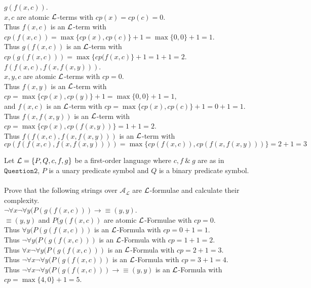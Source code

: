 \documentclass[11pt,a4paper]{article}
\begin{document}
\qpartnb $g(f(x,c))$.\\

\apart
$x,c$ are atomic $\mathcal{L}$-terms with $cp(x)=cp(c)=0$.\\
Thus $f(x,c)$ is an $\mathcal{L}$-term with $cp(f(x,c))=\max\{cp(x),cp(c)\}+1=\max\{0,0\}+1=1$.\\
Thus $g(f(x,c))$ is an $\mathcal{L}$-term with $cp(g(f(x,c)))=\max\{cp(f(x,c)\}+1=1+1=2$.\\

\qpartnb $f(f(x,c),f(x,f(x,y)))$.\\

\apart
$x,y,c$ are atomic $\mathcal{L}$-terms with $cp=0$.\\
Thus $f(x,y)$ is an $\mathcal{L}$-term with $cp=\max\{cp(x),cp(y)\}+1=\max\{0,0\}+1=1$,\\
and $f(x,c)$ is an $\mathcal{L}$-term with $cp=\max\{cp(x),cp(c)\}+1=0+1=1$.\\
Thus $f(x,f(x,y))$ is an $\mathcal{L}$-term with $cp=\max\{cp(x),cp(f(x,y))\}=1+1=2$.\\
Thus $f(f(x,c),f(x,f(x,y)))$ is an $\mathcal{L}$-term with
$$cp(f(f(x,c),f(x,f(x,y))))=\max\{cp(f(x,c)),cp(f(x,f(x,y)))\}=2+1=3$$

\question
Let $\mathcal{L}=\{P,Q,c,f,g\}$ be a first-order language where $c,f\ \&\ g$ are as in $\mathtt{Question 2}$, $P$ is a unary predicate symbol and $Q$ is a binary predicate symbol.\\
\\
Prove that the following strings over $\mathcal{A_L}$ are $\mathcal{L}$-formulae and calculate their complexity.\\

\qpartnb $\neg\forall x\neg\forall y(P(g(f(x,c)))\longrightarrow\equiv(y,y)$.\\

\apart
$\equiv(y,y)$ and $P(g(f(x,c))$ are atomic $\mathcal{L}$-Formulae with $cp=0$.\\
Thus $\forall y(P(g(f(x,c)))$ is an $\mathcal{L}$-Formula with $cp=0+1=1$.\\
Thus $\neg\forall y(P(g(f(x,c)))$ is an $\mathcal{L}$-Formula with $cp=1+1=2$.\\
Thus $\forall x\neg\forall y(P(g(f(x,c)))$ is an $\mathcal{L}$-Formula with $cp=2+1=3$.\\
Thus $\neg\forall x\neg\forall y(P(g(f(x,c)))$ is an $\mathcal{L}$-Formula with $cp=3+1=4$.\\
Thus $\neg\forall x\neg\forall y(P(g(f(x,c)))\longrightarrow\equiv(y,y)$ is an $\mathcal{L}$-Formula with $cp=\max\{4,0\}+1=5$.\\
\end{document}
